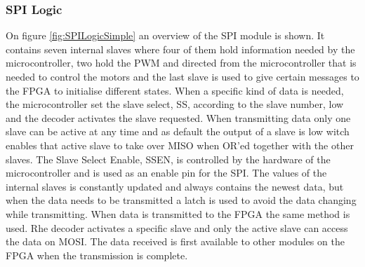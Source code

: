 \documentclass[../../main.tex]{subfiles}
\begin{document}





\subsubsection*{SPI Logic}

On figure \ref{fig:SPILogicSimple} an overview of the SPI module is shown. It contains seven internal slaves where four of them hold information needed by the microcontroller, two hold the PWM and directed from the microcontroller that is needed to control the motors and the last slave is used to give certain messages to the FPGA to initialise different states. When a specific kind of data is needed, the microcontroller set the slave select, SS, according to the slave number, low and the decoder activates the slave requested. When transmitting data only one slave can be active at any time and as default the output of a slave is low witch enables that active slave to take over MISO when OR'ed together with the other slaves. The Slave Select Enable, SSEN, is controlled by the hardware of the microcontroller and is used as an enable pin for the SPI. The values of the internal slaves is constantly updated and always contains the newest data, but when the data needs to be transmitted a latch is used to avoid the data changing while transmitting. 
When data is transmitted to the FPGA the same method is used. Rhe decoder activates a specific slave and only the active slave can access the data on MOSI. The data received is first available to other modules on the FPGA when the transmission is complete. 
\end{document}
